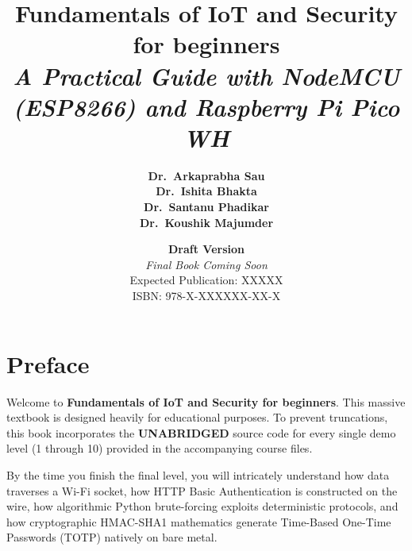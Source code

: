 \documentclass[11pt,a4paper]{book}
\title{
    \vspace{2cm}
    \Huge \textcolor{primary}{\textbf{Fundamentals of IoT and Security for beginners}}\\
    \vspace{0.5cm}
    \Large \textcolor{secondary}{\textit{A Practical Guide with NodeMCU (ESP8266) and Raspberry Pi Pico WH}}
    \vspace{2cm}
}
\author{
\Large \textcolor{darkbg}{\textbf{
Dr.\ Arkaprabha Sau \\[0.3cm]
Dr.\ Ishita Bhakta \\[0.3cm]
Dr.\ Santanu Phadikar \\[0.3cm]
Dr.\ Koushik Majumder
}}
}
\date{
\vspace{1cm}
\textbf{Draft Version} \\[0.3cm]
\textit{Final Book Coming Soon} \\[0.5cm]
Expected Publication: XXXXX \\[0.5cm]
\textcolor{darkbg}{ISBN: 978-X-XXXXXX-XX-X}
}
\begin{document}
\maketitle

\chapter*{Preface}
Welcome to \textbf{Fundamentals of IoT and Security for beginners}. This massive textbook is designed heavily for educational purposes. To prevent truncations, this book incorporates the \textbf{UNABRIDGED} source code for every single demo level (1 through 10) provided in the accompanying course files. 

By the time you finish the final level, you will intricately understand how data traverses a Wi-Fi socket, how HTTP Basic Authentication is constructed on the wire, how algorithmic Python brute-forcing exploits deterministic protocols, and how cryptographic HMAC-SHA1 mathematics generate Time-Based One-Time Passwords (TOTP) natively on bare metal.

\tableofcontents









\end{document}
